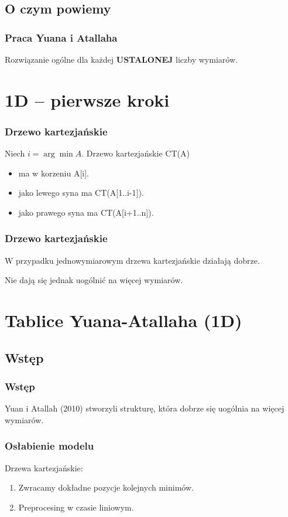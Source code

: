 \documentclass{beamer}
\begin{document}
\subsection{O czym powiemy}
\begin{frame} \frametitle{Praca Yuana i Atallaha}
 Rozwiązanie ogólne dla każdej \textbf{USTALONEJ} liczby wymiarów.
\end{frame}


\section{1D -- pierwsze kroki}

\begin{frame} \frametitle{Drzewo kartezjańskie}
 Niech $i = \arg\min A$. Drzewo kartezjańskie CT(A)
 \begin{itemize}
  \item ma w korzeniu A[i].
  \item jako lewego syna ma CT(A[1..i-1]).
  \item jako prawego syna ma CT(A[i+1..n]).
 \end{itemize}
\end{frame}

\begin{frame} \frametitle{Drzewo kartezjańskie}
 W przypadku jednowymiarowym drzewa kartezjańskie działają dobrze.
 
 Nie dają się jednak uogólnić na więcej wymiarów.
\end{frame}

\section{Tablice Yuana-Atallaha (1D)}

\subsection{Wstęp}
\begin{frame} \frametitle{Wstęp}
 Yuan i Atallah (2010) stworzyli strukturę, która dobrze się uogólnia na więcej wymiarów.
\end{frame}

\begin{frame} \frametitle{Osłabienie modelu}
 Drzewa kartezjańskie:
 \begin{enumerate}
  \item Zwracamy dokładne pozycje kolejnych minimów.
  \item Preprocesing w czasie liniowym.
 \end{enumerate}
\end{frame}
\end{document}
